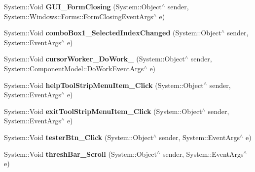 \begin{DoxyCompactItemize}
\item 
\mbox{\label{class_gaze_track_g_u_i_1_1_g_u_i_a4a06beeee9cc5237a98521454a13cd47}} 
System\+::\+Void {\bfseries G\+U\+I\+\_\+\+Form\+Closing} (System\+::\+Object$^\wedge$ sender, System\+::\+Windows\+::\+Forms\+::\+Form\+Closing\+Event\+Args$^\wedge$ e)
\item 
\mbox{\label{class_gaze_track_g_u_i_1_1_g_u_i_abc716609654c115580c307e190aa0c9b}} 
System\+::\+Void {\bfseries combo\+Box1\+\_\+\+Selected\+Index\+Changed} (System\+::\+Object$^\wedge$ sender, System\+::\+Event\+Args$^\wedge$ e)
\item 
\mbox{\label{class_gaze_track_g_u_i_1_1_g_u_i_a139695b127337a7b3933da84017448c0}} 
System\+::\+Void {\bfseries cursor\+Worker\+\_\+\+Do\+Work\+\_} (System\+::\+Object$^\wedge$ sender, System\+::\+Component\+Model\+::\+Do\+Work\+Event\+Args$^\wedge$ e)
\item 
\mbox{\label{class_gaze_track_g_u_i_1_1_g_u_i_a8629b50a1c59a0eef8961223a7b563c4}} 
System\+::\+Void {\bfseries help\+Tool\+Strip\+Menu\+Item\+\_\+\+Click} (System\+::\+Object$^\wedge$ sender, System\+::\+Event\+Args$^\wedge$ e)
\item 
\mbox{\label{class_gaze_track_g_u_i_1_1_g_u_i_a0c9951a59bebf1ab8bf6505f264f3c3f}} 
System\+::\+Void {\bfseries exit\+Tool\+Strip\+Menu\+Item\+\_\+\+Click} (System\+::\+Object$^\wedge$ sender, System\+::\+Event\+Args$^\wedge$ e)
\item 
\mbox{\label{class_gaze_track_g_u_i_1_1_g_u_i_aff2b925404eb7cf837be639b29ef13fd}} 
System\+::\+Void {\bfseries tester\+Btn\+\_\+\+Click} (System\+::\+Object$^\wedge$ sender, System\+::\+Event\+Args$^\wedge$ e)
\item 
\mbox{\label{class_gaze_track_g_u_i_1_1_g_u_i_a241cd473b84eee180a58187cb47b8146}} 
System\+::\+Void {\bfseries thresh\+Bar\+\_\+\+Scroll} (System\+::\+Object$^\wedge$ sender, System\+::\+Event\+Args$^\wedge$ e)
\item 
\mbox{\label{class_gaze_track_g_u_i_1_1_g_u_i_a6b407de39862bebec58b9b4bdb685fe0}} 

\end{DoxyCompactItemize}
